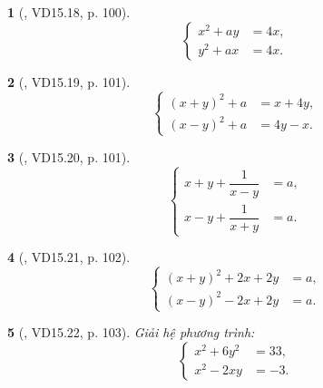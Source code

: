 \documentclass{article}
\newtheorem{baitoan}{}
\begin{document}
\begin{baitoan}[\cite{TLCT_THCS_Toan_9_dai_so}, VD15.18, p. 100]
	\begin{equation*}
		\left\{\begin{split}
			x^2 + ay &= 4x,\\
			y^2 + ax &= 4x.
		\end{split}\right.
	\end{equation*}
\end{baitoan}

\begin{baitoan}[\cite{TLCT_THCS_Toan_9_dai_so}, VD15.19, p. 101]
	\begin{equation*}
		\left\{\begin{split}
			(x + y)^2 + a &= x + 4y,\\
			(x - y)^2 + a &= 4y - x.
		\end{split}\right.
	\end{equation*}
\end{baitoan}

\begin{baitoan}[\cite{TLCT_THCS_Toan_9_dai_so}, VD15.20, p. 101]
	\begin{equation*}
		\left\{\begin{split}
			x + y + \dfrac{1}{x - y} &= a,\\
			x - y + \dfrac{1}{x + y} &= a.
		\end{split}\right.
	\end{equation*}
\end{baitoan}

\begin{baitoan}[\cite{TLCT_THCS_Toan_9_dai_so}, VD15.21, p. 102]
	\begin{equation*}
		\left\{\begin{split}
			(x + y)^2 + 2x + 2y &= a,\\
			(x - y)^2 - 2x + 2y &= a.
		\end{split}\right.
	\end{equation*}
\end{baitoan}

\begin{baitoan}[\cite{TLCT_THCS_Toan_9_dai_so}, VD15.22, p. 103]
	Giải hệ phương trình:
	\begin{equation*}
		\left\{\begin{split}
			x^2 + 6y^2 &= 33,\\
			x^2 - 2xy &= -3.
		\end{split}\right.
	\end{equation*}
\end{baitoan}
\end{document}
